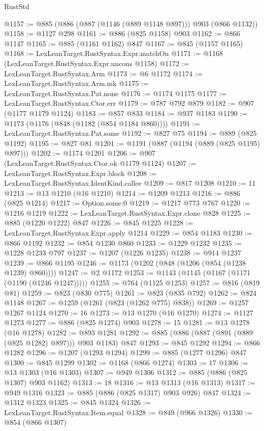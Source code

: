 \begin{lexlean}{RustStd}
\begin{coremodule}
@1157 := @885 (@886 (@887 (@1146 (@889 @1148 @897))) @903 (@866 @1132))
@1158 := @1127 @298
@1161 := @886 (@825 @1158) @903
@1162 := @866 @1147
@1165 := @885 (@1161 @1162) @847
@1167 := @845 (@1157 @1165)
@1168 := LexLeanTarget.RustSyntax.Expr.matchOn
@1171 := @1168 (LexLeanTarget.RustSyntax.Expr.uncons @1158)
@1172 := LexLeanTarget.RustSyntax.Arm
@1173 := @6 @1172
@1174 := LexLeanTarget.RustSyntax.Arm.mk
@1175 := LexLeanTarget.RustSyntax.Pat.none
@1176 := @1174 @1175
@1177 := LexLeanTarget.RustSyntax.Ctor.err
@1179 := @787 @792 @879
@1182 := @907 (@1177 @1179 @1124)
@1183 := @857 @833
@1184 := @937 @1183
@1190 := @1173 (@1176 (@848 (@1182 (@854 @1184 @860))))
@1191 := LexLeanTarget.RustSyntax.Pat.some
@1192 := @827 @75
@1194 := @889 (@825 @1192)
@1195 := @827 @81
@1201 := @1191 (@887 (@1194 (@889 (@825 @1195) @897)))
@1202 := @1174 @1201
@1206 := @907 (LexLeanTarget.RustSyntax.Ctor.ok @1179 @1124)
@1207 := LexLeanTarget.RustSyntax.Expr.block
@1208 := LexLeanTarget.RustSyntax.IdentKind.callee
@1209 := @817 @1208
@1210 := 11
@1213 := @13 @1210 (@16 @1210)
@1214 := @1209 @1213
@1216 := @886 (@825 @1214)
@1217 := Option.some.{0}
@1219 := @1217 @773 @767
@1220 := @1216 @1219
@1222 := LexLeanTarget.RustSyntax.Expr.clone @828
@1225 := @885 (@1220 @1222) @847
@1226 := @845 @1225
@1228 := LexLeanTarget.RustSyntax.Expr.apply @1214
@1229 := @854 @1183
@1230 := @866 @1192
@1232 := @854 @1230 @860
@1233 := @1229 @1232
@1235 := @1228 @1233 @797
@1237 := @1207 (@1226 @1235)
@1238 := @914 @1237
@1239 := @866 @1195
@1246 := @1173 (@1202 (@848 (@1206 (@854 (@1238 @1239) @860))))
@1247 := @2 @1172
@1253 := @1143 (@1145 (@1167 (@1171 (@1190 (@1246 @1247)))))
@1255 := @764 (@1125 @1253)
@1257 := @816 (@819 @81)
@1259 := @823 (@830 @775)
@1261 := @823 (@835 @792)
@1262 := @824 @1148
@1267 := @1259 (@1261 (@823 (@1262 @775) @838))
@1269 := @1257 @1267 @1124
@1270 := 16
@1273 := @13 @1270 (@16 @1270)
@1274 := @1127 @1273
@1277 := @886 (@825 @1274) @903
@1278 := 15
@1281 := @13 @1278 (@16 @1278)
@1282 := @893 @1281
@1292 := @885 (@886 (@887 (@891 (@889 (@825 @1282) @897))) @903 @1183) @847
@1293 := @845 @1292
@1294 := @866 @1282
@1296 := @1207 (@1293 @1294)
@1299 := @885 (@1277 @1296) @847
@1300 := @845 @1299
@1302 := @1168 (@866 @1274)
@1303 := 17
@1306 := @13 @1303 (@16 @1303)
@1307 := @949 @1306
@1312 := @885 (@886 (@825 @1307) @903 @1162)
@1313 := 18
@1316 := @13 @1313 (@16 @1313)
@1317 := @949 @1316
@1323 := @885 (@886 (@825 @1317) @903 @926) @847
@1324 := @1312 @1323
@1325 := @845 @1324
@1326 := LexLeanTarget.RustSyntax.Item.equal
@1328 := @849 (@966 @1326)
@1330 := @854 (@866 @1307)

\end{coremodule}
\end{lexlean}
